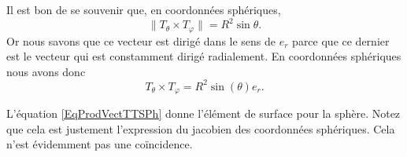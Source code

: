 \begin{example}
	Il est bon de se souvenir que, en coordonnées sphériques,
	\begin{equation}
		\| T_{\theta}\times T_{\varphi} \|=R^2\sin\theta.
	\end{equation}
	Or nous savons que ce vecteur est dirigé dans le sens de \( e_r\) parce que ce dernier est le vecteur qui est constamment dirigé radialement. En coordonnées sphériques nous avons donc
	\begin{equation}        \label{EqNormalEnSpeh}
		T_{\theta}\times T_{\varphi}=R^2\sin(\theta)e_r.
	\end{equation}

\end{example}

\begin{remark}
	L'équation \eqref{EqProdVectTTSPh} donne l'élément de surface pour la sphère. Notez que cela est justement l'expression du jacobien des coordonnées sphériques. Cela n'est évidemment pas une coïncidence.
\end{remark}

